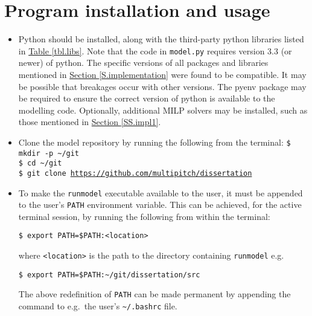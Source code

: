 %
%
%
%
\addappheadtotoc
\chapter{Program installation and usage}\label{C.Appendix1}
\begin{itemize}
\item
Python should be installed, along with the third-party python libraries
listed in \hyperref[tbl.libs]{Table \ref*{tbl.libs}}.
Note that the code in \texttt{model.py} requires version 3.3 (or newer) of
python.
The specific versions of all packages and libraries mentioned in
\hyperref[S.implementation]{Section \ref*{S.implementation}}
were found to be compatible.
It may be possible that breakages occur with other versions.
The pyenv package may be required to ensure the correct version of python is
available to the modelling code.
Optionally, additional
MILP solvers may be installed, such as those mentioned in
\hyperref[SS.impl1]{Section \ref*{SS.impl1}}.

\item
Clone the model repository by running the following from the terminal:
\texttt{\$ mkdir -p \textasciitilde/git\\
        \$ cd \textasciitilde/git\\
        \$ git clone \url{https://github.com/multipitch/dissertation}}

\item
To make the \texttt{runmodel} executable available to the user, it must be
appended to the user's \texttt{PATH} environment variable.
This can be achieved, for the active terminal session, by running the following
from within the terminal:

\texttt{\$ export PATH=\$PATH:<location>}

where \texttt{<location>} is the path to the directory containing
\texttt{runmodel} e.g.

\texttt{\$ export PATH=\$PATH:\textasciitilde/git/dissertation/src}

The above redefinition of \texttt{PATH} can be made permanent by appending the
command to e.g.\ the user's \texttt{\textasciitilde/.bashrc} file.


\end{itemize}
